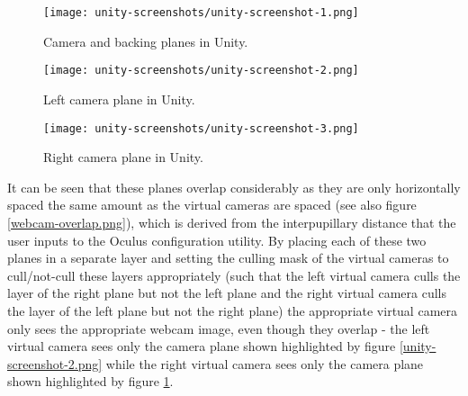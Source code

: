 \begin{figure}[h]
    \begin{center}
    \begin{minipage}[t]{.32\textwidth}
        \begin{center}
        \texttt{[image: unity-screenshots/unity-screenshot-1.png]}
        \caption{Camera and backing planes in Unity.}
        \label{unity-screenshot-1.png}
        \end{center}
    \end{minipage}%
    \hspace{.01\textwidth}
    \begin{minipage}[t]{.32\textwidth}
		\begin{center}
        \texttt{[image: unity-screenshots/unity-screenshot-2.png]}
        \caption{Left camera plane in Unity.}
        \label{unity-screenshot-2.png}
        \end{center}
    \end{minipage}%
    \hspace{.01\textwidth}
    \begin{minipage}[t]{.32\textwidth}
        \begin{center}
        \texttt{[image: unity-screenshots/unity-screenshot-3.png]}
        \caption{Right camera plane in Unity.}
        \label{unity-screenshot-3.png}
        \end{center}
    \end{minipage}
    \end{center}
\end{figure}

It can be seen that these planes overlap considerably as they are only horizontally spaced the same amount as the virtual cameras are spaced (see also figure \ref{webcam-overlap.png}), which is derived from the interpupillary distance that the user inputs to the Oculus configuration utility. By placing each of these two planes in a separate layer and setting the culling mask of the virtual cameras to cull/not-cull these layers appropriately (such that the left virtual camera culls the layer of the right plane but not the left plane and the right virtual camera culls the layer of the left plane but not the right plane) the appropriate virtual camera only sees the appropriate webcam image, even though they overlap - the left virtual camera sees only the camera plane shown highlighted by figure \ref{unity-screenshot-2.png} while the right virtual camera sees only the camera plane shown highlighted by figure \ref{unity-screenshot-3.png}.

